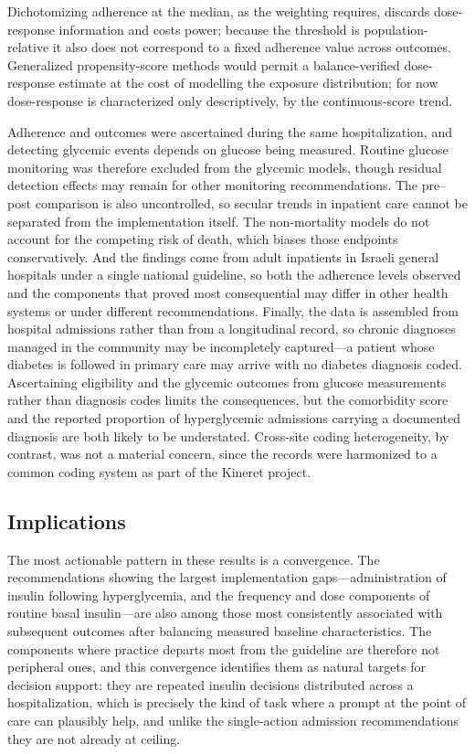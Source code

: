 Dichotomizing adherence at the median, as the weighting requires, discards
dose-response information and costs power; because the threshold is
population-relative it also does not correspond to a fixed adherence value
across outcomes. Generalized propensity-score methods would permit a
balance-verified dose-response estimate at the cost of modelling the
exposure distribution; for now dose-response is characterized only
descriptively, by the continuous-score trend.

Adherence and outcomes were ascertained during the same hospitalization, and
detecting glycemic events depends on glucose being measured. Routine glucose
monitoring was therefore excluded from the glycemic models, though residual
detection effects may remain for other monitoring recommendations. The
pre--post comparison is also uncontrolled, so secular trends in inpatient
care cannot be separated from the implementation itself. The non-mortality
models do not account for the competing risk of death, which biases those
endpoints conservatively. And the findings come from adult inpatients in
Israeli general hospitals under a single national guideline, so both the
adherence levels observed and the components that proved most consequential
may differ in other health systems or under different recommendations.
Finally, the data is assembled from hospital admissions rather than from a
longitudinal record, so chronic diagnoses managed in the community may be
incompletely captured---a patient whose diabetes is followed in primary care
may arrive with no diabetes diagnosis coded. Ascertaining eligibility and the
glycemic outcomes from glucose measurements rather than diagnosis codes
limits the consequences, but the comorbidity score and the reported
proportion of hyperglycemic admissions carrying a documented diagnosis are
both likely to be understated. Cross-site coding heterogeneity, by contrast,
was not a material concern, since the records were harmonized to a common
coding system as part of the Kineret project.

\subsection{Implications}

The most actionable pattern in these results is a convergence. The
recommendations showing the largest implementation gaps---administration of
insulin following hyperglycemia, and the frequency and dose components of
routine basal insulin---are also among those most consistently associated
with subsequent outcomes after balancing measured baseline characteristics.
The components where practice departs most from the guideline are therefore
not peripheral ones, and this convergence identifies them as natural targets
for decision support: they are repeated insulin decisions distributed
across a hospitalization, which is precisely the kind of task where a
prompt at the point of care can plausibly help, and unlike the
single-action admission recommendations they are not already at ceiling.


